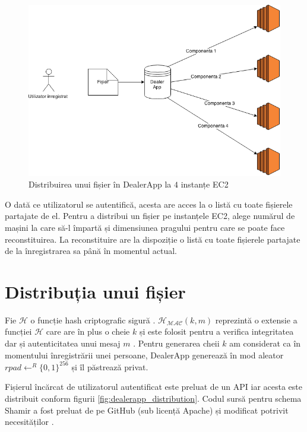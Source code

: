 \documentclass[oneside, 12pt]{book}
\begin{document}
\begin{figure}
	\begin{center}
	\includegraphics[width=1\textwidth]{img/DealerApp.png}
	\caption{Distribuirea unui fișier în DealerApp la $4$ instanțe EC2}
	\label{fig:dealerapp}
	\end{center}
	\bigskip
\end{figure}


O dată ce utilizatorul se autentifică, acesta are acces la o listă cu toate fișierele partajate de el. Pentru a distribui un fișier pe instanțele EC2, alege numărul de mașini la care să-l împartă și dimensiunea pragului pentru care se poate face reconstituirea. La reconstituire are la dispoziție o listă cu toate fișierele partajate de la înregistrarea sa până în momentul actual.


\section{Distribuția unui fișier}

Fie $\mathcal{H}$ o funcție hash criptografic sigură \cite{Katz:2007}. $\mathcal{H_{MAC}}(k, m)$ reprezintă o extensie a funcției $\mathcal{H}$ care are în plus o cheie $k$ și este folosit pentru a verifica integritatea dar și autenticitatea unui mesaj $m$ \cite{krawczyk1997hmac}. Pentru generarea cheii $k$ am considerat ca în momentului înregistrării unei persoane, DealerApp generează în mod aleator $rpad \leftarrow^R \{0,1\}^{256}$ și îl păstrează privat.

Fișierul încărcat de utilizatorul autentificat este preluat de un API iar acesta este distribuit conform figurii \ref{fig:dealerapp_distribution}. Codul sursă pentru schema Shamir a fost preluat de pe GitHub (sub licență Apache) și modificat potrivit necesităților \cite{website:pysss-github}.
\end{document}

